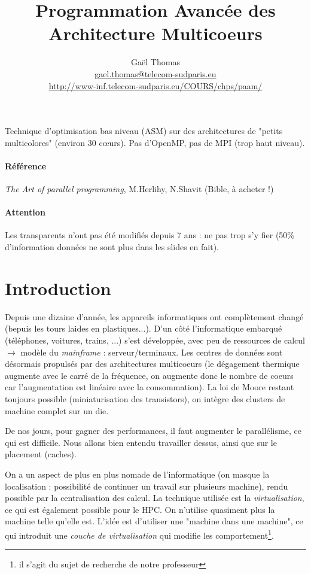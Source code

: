 \documentclass{article}
\title{Programmation Avancée des Architecture Multicoeurs}
\author{Gaël Thomas\\
\url{gael.thomas@telecom-sudparis.eu}\\
\url{http://www-inf.telecom-sudparis.eu/COURS/chps/paam/}}
\date{}
\begin{document}
\maketitle
\tableofcontents
\newpage


Technique d'optimisation bas niveau (ASM) sur des architectures de "petits multicolores" (environ 30 cœurs). Pas d'OpenMP, pas de MPI (trop haut niveau).

\paragraph{Référence} \emph{The Art of parallel programming}, M.Herlihy, N.Shavit (Bible, à acheter !)

\paragraph{Attention} Les transparents n'ont pas été modifiés depuis 7 ans : ne pas trop s'y fier (50\% d'information données ne sont plus dans les slides en fait).

\section{Introduction}
Depuis une dizaine d'année, les appareils informatiques ont complètement changé (bepuis les tours laides en plastiques...). D'un côté l'informatique embarqué (téléphones, voitures, trains, ...) s'est développée, avec peu de ressources de calcul $\to$ modèle du \emph{mainframe} : serveur/terminaux. Les centres de données sont désormais propulsés par des architectures multicoeurs (le dégagement thermique augmente avec le carré de la fréquence, on augmente donc le nombre de coeurs car l'augmentation est linéaire avec la consommation). La loi de Moore restant toujours possible (miniaturisation des transistors), on intègre des clusters de machine complet sur un die.

De nos jours, pour gagner des performances, il faut augmenter le parallélisme, ce qui est difficile. Nous allons bien entendu travailler dessus, ainsi que sur le placement (caches).

On a un aspect de plus en plus nomade de l'informatique (on masque la localisation : possibilité de continuer un travail sur plusieurs machine), rendu possible par la centralisation des calcul. La technique utilisée est la \emph{virtualisation}, ce qui est également possible pour le HPC. On n'utilise quasiment plus la machine telle qu'elle est. L'idée est d'utiliser une "machine dans une machine", ce qui introduit une \emph{couche de virtualisation} qui modifie les comportement\footnote{il s'agit du sujet de recherche de notre professeur}.
\end{document}
